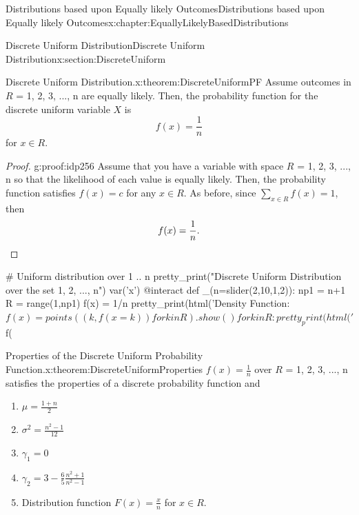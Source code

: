 \documentclass[oneside,10pt,]{book}
\newcommand{\qedhere}{\relax}
\numberwithin{equation}{section}
\begin{document}
\begin{chapterptx}{Distributions based upon Equally likely Outcomes}{}{Distributions based upon Equally likely Outcomes}{}{}{x:chapter:EquallyLikelyBasedDistributions}
\begin{sectionptx}{Discrete Uniform Distribution}{}{Discrete Uniform Distribution}{}{}{x:section:DiscreteUniform}
\begin{theorem}{Discrete Uniform Distribution.}{}{x:theorem:DiscreteUniformPF}
Assume outcomes in \(R\) = \textbraceleft{}1, 2, 3, ..., n\textbraceright{} are equally likely.  Then, the probability function for the discrete uniform variable \(X\) is%
\begin{equation*}
f(x) = \frac{1}{n}
\end{equation*}
for \(x \in R\).%
\end{theorem}
\begin{proof}{}{g:proof:idp256}
Assume that you have a variable with space \(R\) = \textbraceleft{}1, 2, 3, ..., n\textbraceright{} so that the likelihood of each value is equally likely. Then, the probability function satisfies \(f(x) = c\) for any \(x \in R\).  As before, since \(\sum_{x \in R} f(x) = 1\), then%
\begin{equation*}
f(x) = \frac{1}{n}.\qedhere
\end{equation*}
%
\end{proof}
%
\par
\leavevmode%
\begin{sageinput}
# Uniform distribution over 1 .. n
pretty_print("Discrete Uniform Distribution over the set 1, 2, ..., n")
var('x')
@interact
def _(n=slider(2,10,1,2)):
    np1 = n+1
    R = range(1,np1)
    f(x) = 1/n
    pretty_print(html('Density Function: $f(x) =%
    points((k,f(x=k)) for k in R).show()
    for k in R:
        pretty_print(html('$f(%
\end{sageinput}
%
\par
\begin{theorem}{Properties of the Discrete Uniform Probability Function.}{}{x:theorem:DiscreteUniformProperties}%
\(f(x) = \frac{1}{n}\) over \(R\) = \textbraceleft{}1, 2, 3, ..., n\textbraceright{} satisfies the properties of a discrete probability function and%
\begin{enumerate}
\item{}\(\displaystyle \mu = \frac{1+n}{2}\)%
\item{}\(\displaystyle \sigma^2 = \frac{n^2-1}{12}\)%
\item{}\(\displaystyle \gamma_1 = 0\)%
\item{}\(\displaystyle \gamma_2 = 3 - \frac{6}{5}\frac{n^2+1}{n^2-1}\)%
\item{}Distribution function \(F(x) = \frac{x}{n}\) for \(x \in R\).%
\end{enumerate}
%
\end{theorem}

\end{sectionptx}
\end{chapterptx}
\end{document}
